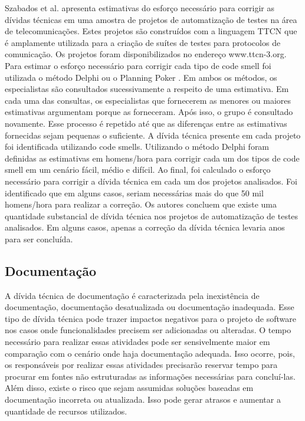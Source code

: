 Szabados et al.\cite{szabados2015technical} apresenta estimativas do esforço necessário para corrigir as dívidas técnicas em uma amostra de projetos de automatização de testes na área de telecomunicações. Estes projetos são construídos com a linguagem TTCN que é amplamente utilizada para a criação de suítes de testes para protocolos de comunicação. Os projetos foram disponibilizados no endereço www.ttcn-3.org. Para estimar o esforço necessário para corrigir cada tipo de code smell foi utilizada o método Delphi ou o Planning Poker \cite{grenning2002planning}. Em ambos os métodos, os especialistas são consultados sucessivamente a respeito de uma estimativa. Em cada uma das consultas, os especialistas que fornecerem as menores ou maiores estimativas argumentam porque  as forneceram. Após isso, o grupo é consultado novamente. Esse processo é repetido até que as diferenças entre as estimativas fornecidas sejam pequenas o suficiente.  A dívida técnica presente em cada projeto foi identificada utilizando code smells. Utilizando o método Delphi foram definidas as estimativas em homens/hora para corrigir cada um dos tipos de code smell em um cenário fácil, médio e difícil. Ao final, foi calculado o esforço necessário para corrigir a dívida técnica em cada um dos projetos analisados. Foi identificado que em alguns casos, seriam necessárias mais do que 50 mil homens/hora para realizar a correção. Os autores concluem que existe uma quantidade substancial de dívida técnica nos projetos de automatização de testes analisados. Em alguns casos, apenas a correção da dívida técnica levaria anos para ser concluída. 



\subsection{Documentação}

 A dívida técnica de documentação é caracterizada pela  inexistência de documentação, documentação desatualizada ou documentação inadequada. Esse tipo de dívida técnica pode trazer impactos negativos para o projeto de software nos casos onde funcionalidades precisem ser adicionadas ou alteradas. O tempo necessário para realizar essas atividades pode ser sensivelmente maior em comparação com o cenário onde haja documentação adequada. Isso ocorre, pois, os responsáveis por realizar essas atividades precisarão reservar tempo para procurar em fontes não estruturadas as informações necessárias para concluí-las. Além disso, existe o risco que sejam assumidas soluções baseadas em documentação incorreta ou atualizada. Isso pode gerar atrasos e aumentar a quantidade de recursos utilizados.

